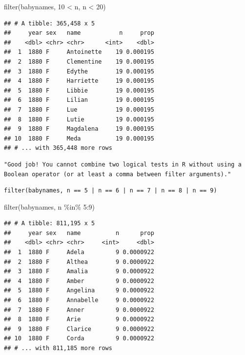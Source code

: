 \documentclass[
]{article}
\newenvironment{Shaded}{\begin{snugshade}}{\end{snugshade}}
\newcommand{\DecValTok}[1]{\textcolor[rgb]{0.00,0.00,0.81}{#1}}
\newcommand{\FunctionTok}[1]{\textcolor[rgb]{0.00,0.00,0.00}{#1}}
\newcommand{\NormalTok}[1]{#1}
\newcommand{\SpecialCharTok}[1]{\textcolor[rgb]{0.00,0.00,0.00}{#1}}
\begin{document}
\begin{Shaded}
\begin{Highlighting}[]
\FunctionTok{filter}\NormalTok{(babynames, }\DecValTok{10} \SpecialCharTok{\textless{}}\NormalTok{ n, n }\SpecialCharTok{\textless{}} \DecValTok{20}\NormalTok{)}
\end{Highlighting}
\end{Shaded}

\begin{verbatim}
## # A tibble: 365,458 x 5
##     year sex   name           n     prop
##    <dbl> <chr> <chr>      <int>    <dbl>
##  1  1880 F     Antoinette    19 0.000195
##  2  1880 F     Clementine    19 0.000195
##  3  1880 F     Edythe        19 0.000195
##  4  1880 F     Harriette     19 0.000195
##  5  1880 F     Libbie        19 0.000195
##  6  1880 F     Lilian        19 0.000195
##  7  1880 F     Lue           19 0.000195
##  8  1880 F     Lutie         19 0.000195
##  9  1880 F     Magdalena     19 0.000195
## 10  1880 F     Meda          19 0.000195
## # ... with 365,448 more rows
\end{verbatim}

\begin{verbatim}
"Good job! You cannot combine two logical tests in R without using a Boolean operator (or at least a comma between filter arguments)."
\end{verbatim}

\begin{verbatim}
filter(babynames, n == 5 | n == 6 | n == 7 | n == 8 | n == 9)
\end{verbatim}

\begin{Shaded}
\begin{Highlighting}[]
\FunctionTok{filter}\NormalTok{(babynames, n }\SpecialCharTok{\%in\%} \DecValTok{5}\SpecialCharTok{:}\DecValTok{9}\NormalTok{)}
\end{Highlighting}
\end{Shaded}

\begin{verbatim}
## # A tibble: 811,195 x 5
##     year sex   name          n      prop
##    <dbl> <chr> <chr>     <int>     <dbl>
##  1  1880 F     Adela         9 0.0000922
##  2  1880 F     Althea        9 0.0000922
##  3  1880 F     Amalia        9 0.0000922
##  4  1880 F     Amber         9 0.0000922
##  5  1880 F     Angelina      9 0.0000922
##  6  1880 F     Annabelle     9 0.0000922
##  7  1880 F     Anner         9 0.0000922
##  8  1880 F     Arie          9 0.0000922
##  9  1880 F     Clarice       9 0.0000922
## 10  1880 F     Corda         9 0.0000922
## # ... with 811,185 more rows
\end{verbatim}
\end{document}

